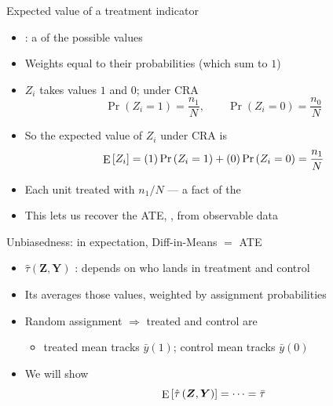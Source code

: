 \documentclass[table, xcolor = {dvipsnames}, 9pt]{beamer}
\theoremstyle{plain}
\newcommand{\mh}[1]{{\color{magenta}{#1}}}
\DeclareMathOperator{\E}{\rm{E}}
\begin{document}
\begin{frame}[t]{Expected value of a treatment indicator}
\vfill
\begin{itemize} \vfill
\item \mh{Expected value}: a \mh{weighted average} of the possible values \vfill
\item[] Weights equal to their probabilities (which sum to $1$) \vfill
\item $Z_i$ takes values $1$ and $0$; under CRA
\begin{equation*}
\Pr\left(Z_i = 1\right) = \frac{n_1}{N}, \qquad \Pr\left(Z_i = 0\right) = \frac{n_0}{N}
\end{equation*} \vfill
\item So the expected value of $Z_i$ under CRA is
\begin{equation*}
\E\left[Z_i\right] = (1)\Pr\left(Z_i = 1\right) + (0)\Pr\left(Z_i = 0\right) = \frac{n_1}{N}
\end{equation*} \vfill
\item Each unit treated with \mh{probability} $n_1/N$ --- a fact of the \mh{mechanism} \vfill
\item This lets us recover the ATE, \mh{in expectation}, from observable data \vfill
\end{itemize} \vfill
\end{frame}
\begin{frame}[t]{Unbiasedness: in expectation, Diff-in-Means $=$ ATE}
\vfill
\begin{itemize} \vfill
\item $\hat{\tau}\left(\bm{Z}, \bm{Y}\right)$ \mh{random}: depends on who lands in treatment and control \vfill
\item Its \mh{expectation} averages those values, weighted by assignment probabilities \vfill
\item Random assignment $\Rightarrow$ treated and control are \mh{unbiased slices} \vfill
\begin{itemize} \vfill
\item treated mean tracks $\bar{y}(1)$; control mean tracks $\bar{y}(0)$ \vfill
\end{itemize} \vfill
\item We will show
\begin{equation*}
\E\left[\hat{\tau}\left(\bm{Z}, \bm{Y}\right)\right] = \cdots = \bar{\tau}
\end{equation*} \vfill
\end{itemize} \vfill
\end{frame}
\end{document}
